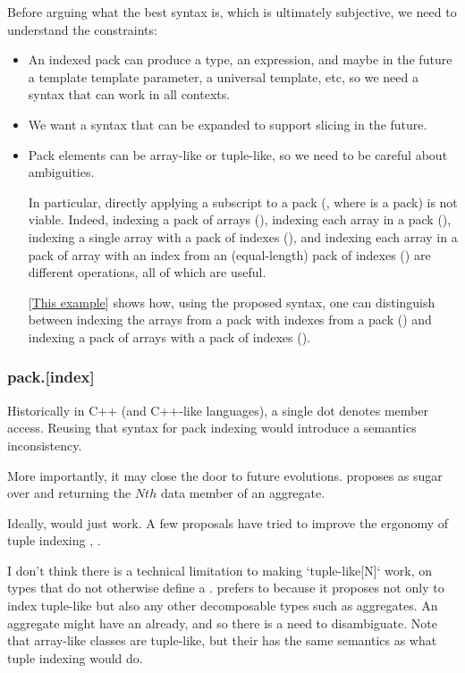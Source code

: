 \documentclass{wg21}
\begin{document}
Before arguing what the best syntax is, which is ultimately subjective, we need to understand the constraints:
\begin{itemize}
\item An indexed pack can produce a type, an expression, and maybe in the future a template template parameter, a universal template, etc, so we need a syntax
that can work in all contexts.
\item We want a syntax that can be expanded to support slicing in the future.
\item Pack elements can be array-like or tuple-like, so we need to be careful about ambiguities.

In particular, directly applying a subscript to a pack (, where  is a pack) is not viable.
Indeed, indexing a pack of arrays (), indexing each array in a pack (),
indexing a single array with a pack of indexes (), and indexing each array in a pack of array with an index from an (equal-length) pack of indexes
() are different operations, all of which are useful.

[\href{https://compiler-explorer.com/z/E86h8eMG1}{This example}] shows how, using the proposed syntax, one can distinguish between indexing
the arrays from a pack with indexes from a pack () and indexing a pack of arrays with a pack of indexes ().
\end{itemize}

\subsubsection{pack.[index]}

Historically in C++ (and C++-like languages), a single dot denotes member access.
Reusing that syntax for pack indexing would introduce a semantics inconsistency.

More importantly, it may close the door to future evolutions.
 proposes  as sugar over 
and  returning the $Nth$ data member of an aggregate.

Ideally,  would just work. A few proposals have tried to improve the ergonomy of tuple indexing
, .

I don't think there is a technical limitation to making `tuple-like[N]` work, on types that do not otherwise define a .
 prefers  to \tcode{[]} because it proposes not only to index tuple-like but also any other decomposable types such as aggregates.
An aggregate might have an  already, and so there is a need to disambiguate.
Note that array-like classes are tuple-like, but their  has the same semantics as what tuple indexing would do.
\end{document}
